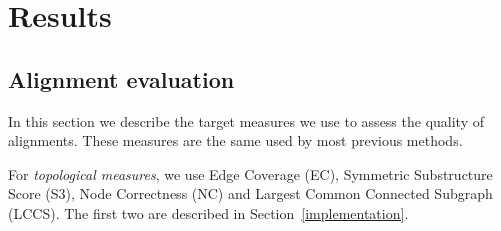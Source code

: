 \documentclass{bioinfo}
\begin{document}
\begin{methods}
%
%

\end{methods}

\section{Results}

\subsection{Alignment evaluation}\label{eval}
In this section we describe the target measures we use to assess the quality of alignments. These measures are the same used by most previous methods. 

For {\em topological measures}, we use Edge Coverage (EC), Symmetric Substructure Score (S3), Node Correctness (NC) and Largest Common Connected Subgraph (LCCS).  The first two are described in Section~\ref{implementation}.
\end{document}
